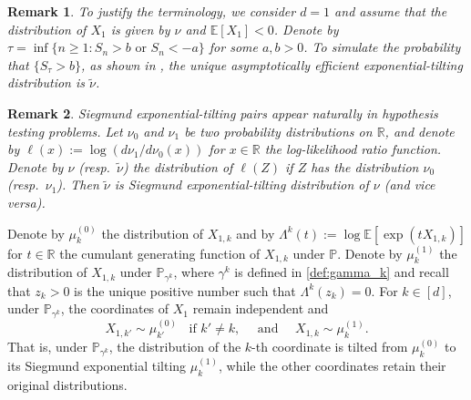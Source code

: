 \documentclass[aap,preprint]{imsart}
\newcommand{\Pro}{{\mathbb{P}}}
\newcommand{\Exp}{{\mathbb{E}}}
\newcommand{\bR}{{\mathbb{R}}}
\theoremstyle{plain}
\newtheorem{remark}{Remark}[section]
\theoremstyle{definition}
\begin{document}
\begin{remark}
To justify the terminology, we consider $d=1$ and assume that the distribution of $X_1$ is given by $\nu$ and $\Exp[X_1] < 0$. Denote by $\tau = \inf\{n \geq 1: S_n > b \text{ or } S_n < -a\}$ for some $a,b > 0$. To simulate the probability that $\{S_{\tau} > b\}$, as shown in \cite{siegmund1976importance}, the unique asymptotically efficient exponential-tilting distribution is $\tilde{\nu}$.
\end{remark}

\begin{remark}
Siegmund exponential-tilting pairs appear naturally in hypothesis testing problems. 
Let $\nu_0$ and $\nu_1$ be two probability distributions on $\bR$, and denote by $\ell(x)  :=  \log(d\nu_1/d\nu_0(x))$ for $x \in \bR$ the log-likelihood ratio function. Denote by $\nu$ (resp.~$\tilde{\nu}$) the distribution of $\ell(Z)$ if $Z$ has the distribution $\nu_0$ (resp.~$\nu_1$). Then $\tilde{\nu}$ is Siegmund exponential-tilting distribution of $\nu$ (and vice versa).
\end{remark}

Denote by $\mu_k^{(0)}$ the distribution of $X_{1,k}$  and by $\Lambda^{k}(t)  :=  \log \Exp[\exp(t X_{1,k})]$ for $t \in \bR$ the cumulant generating function of $X_{1,k}$ under $\Pro$. Denote by $\mu_k^{(1)}$ the distribution of $X_{1,k}$  under $\Pro_{\gamma^{k}}$, where $\gamma^k$ is defined in \eqref{def:gamma_k} and recall that $z_k >0 $ is the unique positive number such that $\Lambda^{k}(z_k) = 0$. For $k \in [d]$, 
under $\Pro_{\gamma^k}$, the coordinates of $X_1$ remain independent and
$$
X_{1,k'} \sim \mu^{(0)}_{k'}\;\; \text{ if } k' \neq k,\quad \text{ and }\quad X_{1,k} \sim \mu^{(1)}_k.
$$
That is, under $\Pro_{\gamma^k}$, the distribution of the $k$-th coordinate is tilted from $\mu^{(0)}_k$ to its Siegmund exponential tilting $\mu^{(1)}_k$, while the other coordinates retain their original distributions.


\end{document}
